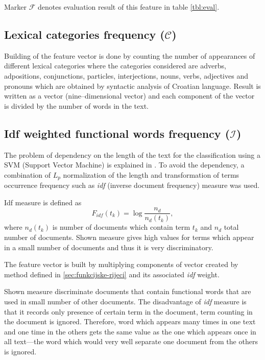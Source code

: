 \documentclass[11pt,english]{article}
\begin{document}
\begin{multicols}{2}
Marker $\mathcal{F}$ denotes evaluation result of this feature in table
\ref{tbl:eval}.

\subsection{Lexical categories frequency ($\mathcal{C}$)}
\label{sec:rijeci-grupe}
Building of the feature vector is done by counting the number of appearances of
different lexical categories where the categories considered are adverbs,
adpositions, conjunctions, particles, interjections, nouns, verbs, adjectives and
pronouns which are obtained by syntactic analysis of Croatian language. Result is
written as a vector (nine--dimensional vector) and each component of the vector
is divided by the number of words in the text.

\subsection{Idf weighted functional words frequency ($\mathcal{I}$)}
\label{sec:funkcijske-rijeci-idf}
The problem of dependency on the length of the text for the classification using
a SVM (Support Vector Machine) is explained in \citep{diederich2003authorship}.
To avoid the dependency, a combination of $L_p$ normalization of the
length and transformation of terms occurrence frequency such as \emph{idf}
(inverse document frequency) measure was used.

Idf measure is defined as \citep{diederich2003authorship}
\begin{equation}
F_{idf}(t_k) = \log \frac{n_d}{n_d(t_k)},
\label{equ:idf}
\end{equation}
where $n_d(t_k)$ is number of documents which contain term $t_k$ and
$n_d$ total number of documents. Shown measure gives high values for terms which
appear in a small number of documents and thus it is very discriminatory.

The feature vector is built by multiplying components of vector created by method
defined in \ref{sec:funkcijske-rijeci} and its associated \emph{idf} weight.

Shown measure discriminate documents that contain functional words that are used
in small number of other documents. The disadvantage of \emph{idf} measure is
that it records only presence of certain term in the document, term
counting in the document is ignored. Therefore, word which appears many times in
one text and one time in the others gets the same value as the one which appears
once in all text---the word which would very well separate one document from the
others is ignored.


\end{multicols}
\end{document}
